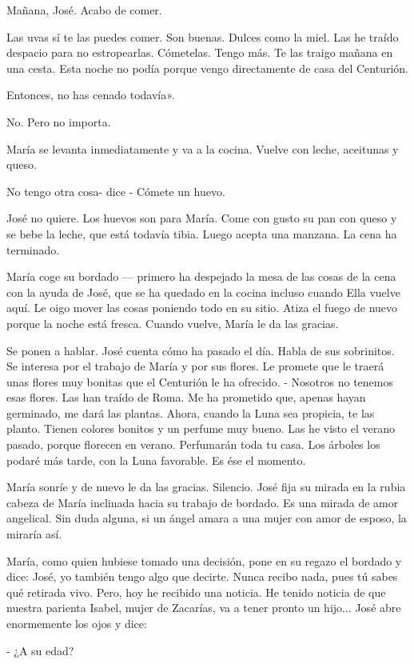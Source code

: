 \documentclass[12pt]{book} %
\begin{document}
Mañana, José. Acabo de comer. 

Las uvas sí te las puedes comer. Son buenas. Dulces como la miel. Las he traído despacio para no estropearlas. Cómetelas. Tengo más. Te las traigo mañana en una cesta. Esta noche no podía porque vengo directamente de casa del Centurión. 

Entonces, no has cenado todavía». 

No. Pero no importa. 

María se levanta inmediatamente y va a la cocina. Vuelve con leche, aceitunas y queso. 

No tengo otra cosa- dice - Cómete un huevo. 

José no quiere. Los huevos son para María. Come con gusto su pan con queso y se bebe la leche, que está todavía tibia. Luego acepta una manzana. La cena ha terminado. 

María coge su bordado — primero ha despejado la mesa de las cosas de la cena con la ayuda de José, que se ha quedado en la cocina incluso cuando Ella vuelve aquí. Le oigo mover las cosas poniendo todo en su sitio. Atiza el fuego de nuevo porque la noche está fresca. Cuando vuelve, María le da las gracias. 

Se ponen a hablar. José cuenta cómo ha pasado el día. Habla de sus sobrinitos. Se interesa por el trabajo de María y por sus flores. Le promete que le traerá unas flores muy bonitas que el Centurión le ha ofrecido. - Nosotros no tenemos esas flores. Las han traído de Roma. Me ha prometido que, apenas hayan germinado, me dará las plantas. Ahora, cuando la Luna sea propicia, te las planto. Tienen colores bonitos y un perfume muy bueno. Las he visto el verano pasado, porque florecen en verano. Perfumarán toda tu casa. Los árboles los podaré más tarde, con la Luna favorable. Es ése el momento. 

María sonríe y de nuevo le da las gracias. Silencio. José fija su mirada en la rubia cabeza de María inclinada hacia su trabajo de bordado. Es una mirada de amor angelical. Sin duda alguna, si un ángel amara a una mujer con amor de esposo, la miraría así. 

María, como quien hubiese tomado una decisión, pone en su regazo el bordado y dice: José, yo también tengo algo que decirte. Nunca recibo nada, pues tú sabes qué retirada vivo. Pero, hoy he recibido una noticia. He tenido noticia de que nuestra parienta Isabel, mujer de Zacarías, va a tener pronto un hijo... José abre enormemente los ojos y dice: 

- ¿A su edad? 
\end{document}
